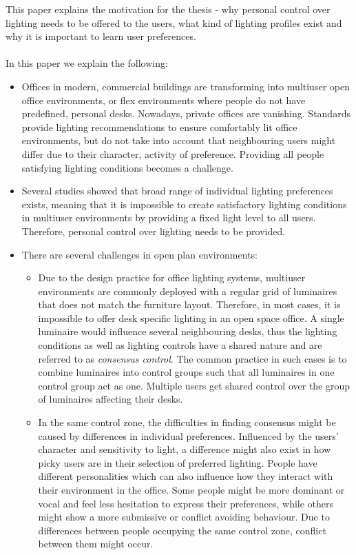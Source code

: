 \documentclass[a4paper]{article}
\begin{document}
\color{red}This paper explains the motivation for the thesis - why personal control over lighting needs to be offered to the users, what kind of lighting profiles exist and why it is important to learn user preferences.
\color{black}
\\\\
In this paper we explain the following:
\begin{itemize}
	\item Offices in modern, commercial buildings are transforming into multiuser open office environments, or flex environments where people do not have predefined, personal desks. Nowadays, private offices are vanishing. Standards provide lighting recommendations to ensure comfortably lit office environments, but do not take into account that neighbouring users might differ due to their character, activity of preference. Providing all people satisfying lighting conditions becomes a challenge. 
	\item Several studies showed that broad range of individual lighting preferences exists, meaning that it is impossible to create satisfactory lighting conditions in multiuser environments by providing a fixed light level to all users. Therefore, personal control over lighting needs to be provided.
	\item There are several challenges in open plan environments:
	\begin{itemize}
		\item Due to the design practice for office lighting systems, multiuser environments are commonly deployed with a regular grid of luminaires that does not match the furniture layout. Therefore, in most cases, it is impossible to offer desk specific lighting in an open space office. A single luminaire would influence several neighbouring desks, thus the lighting conditions as well as lighting controls have a shared nature and are referred to as \textit{consensus control}. The common practice in such cases is to combine luminaires into control groups such that all luminaires in one control group act as one. Multiple users get shared control over the group of luminaires affecting their desks. 
		\item In the same control zone, the difficulties in finding consensus might be caused by differences in individual preferences. Influenced by the users’ character and sensitivity to light, a difference might also exist in how picky users are in their selection of preferred lighting. People have different personalities which can also influence how they interact with their environment in the office. Some people might be more dominant or vocal and feel less hesitation to express their preferences, while others might show a more submissive or conflict avoiding behaviour.  Due to differences between people occupying the same control zone, conflict between them might occur.

\end{itemize}
\end{itemize}
\end{document}

